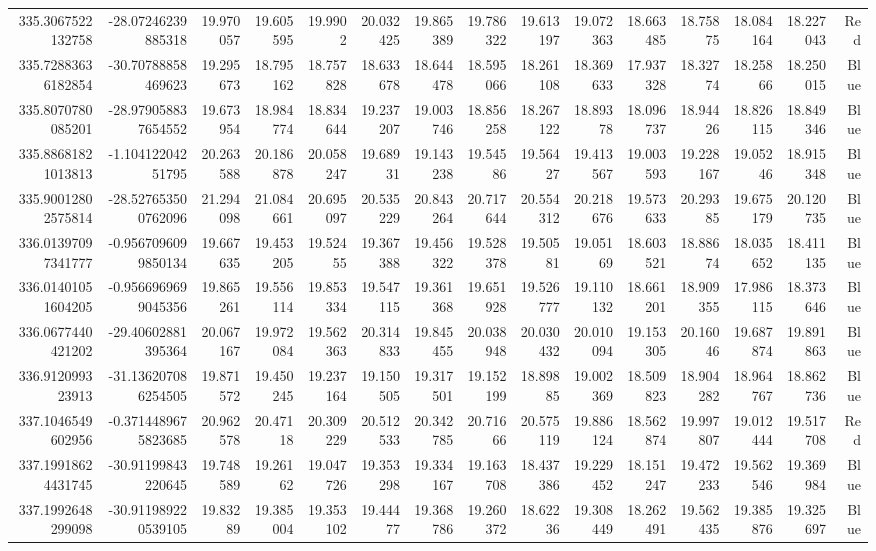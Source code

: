 \begin{center}
\begin{longtable}{rrrrrrrrrrrrrrr}
335.3067522132758 & -28.07246239885318 & 19.970057 & 19.605595 & 19.9902 & 20.032425 & 19.865389 & 19.786322 & 19.613197 & 19.072363 & 18.663485 & 18.75875 & 18.084164 & 18.227043 & Red \\
335.72883636182854 & -30.70788858469623 & 19.295673 & 18.795162 & 18.757828 & 18.633678 & 18.644478 & 18.595066 & 18.261108 & 18.369633 & 17.937328 & 18.32774 & 18.25866 & 18.250015 & Blue \\
335.8070780085201 & -28.979058837654552 & 19.673954 & 18.984774 & 18.834644 & 19.237207 & 19.003746 & 18.856258 & 18.267122 & 18.89378 & 18.096737 & 18.94426 & 18.826115 & 18.849346 & Blue \\
335.88681821013813 & -1.10412204251795 & 20.263588 & 20.186878 & 20.058247 & 19.68931 & 19.143238 & 19.54586 & 19.56427 & 19.413567 & 19.003593 & 19.228167 & 19.05246 & 18.915348 & Blue \\
335.90012802575814 & -28.527653500762096 & 21.294098 & 21.084661 & 20.695097 & 20.535229 & 20.843264 & 20.717644 & 20.554312 & 20.218676 & 19.573633 & 20.29385 & 19.675179 & 20.120735 & Blue \\
336.01397097341777 & -0.9567096099850134 & 19.667635 & 19.453205 & 19.52455 & 19.367388 & 19.456322 & 19.528378 & 19.50581 & 19.05169 & 18.603521 & 18.88674 & 18.035652 & 18.411135 & Blue \\
336.01401051604205 & -0.9566969699045356 & 19.865261 & 19.556114 & 19.853334 & 19.547115 & 19.361368 & 19.651928 & 19.526777 & 19.110132 & 18.661201 & 18.909355 & 17.986115 & 18.373646 & Blue \\
336.0677440421202 & -29.40602881395364 & 20.067167 & 19.972084 & 19.562363 & 20.314833 & 19.845455 & 20.038948 & 20.030432 & 20.010094 & 19.153305 & 20.16046 & 19.687874 & 19.891863 & Blue \\
336.912099323913 & -31.136207086254505 & 19.871572 & 19.450245 & 19.237164 & 19.150505 & 19.317501 & 19.152199 & 18.89885 & 19.002369 & 18.509823 & 18.904282 & 18.964767 & 18.862736 & Blue \\
337.1046549602956 & -0.3714489675823685 & 20.962578 & 20.47118 & 20.309229 & 20.512533 & 20.342785 & 20.71666 & 20.575119 & 19.886124 & 18.562874 & 19.997807 & 19.012444 & 19.517708 & Red \\
337.19918624431745 & -30.91199843220645 & 19.748589 & 19.26162 & 19.047726 & 19.353298 & 19.334167 & 19.163708 & 18.437386 & 19.229452 & 18.151247 & 19.472233 & 19.562546 & 19.369984 & Blue \\
337.1992648299098 & -30.911989220539105 & 19.83289 & 19.385004 & 19.353102 & 19.44477 & 19.368786 & 19.260372 & 18.62236 & 19.308449 & 18.262491 & 19.562435 & 19.385876 & 19.325697 & Blue \\

\end{longtable}
\end{center}
